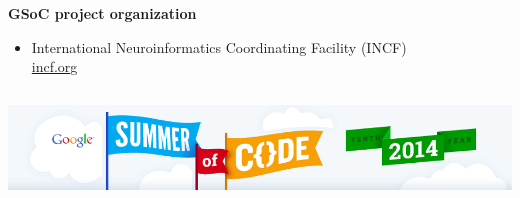 \begin{frame}
\begin{columns}[t]
\begin{column}{0.59\textwidth}
      \vspace{0.3cm}
      
      \textbf{GSoC project organization}
      \begin{itemize}[leftmargin=0.6cm]
        \itemsep6pt
        \item[] International Neuroinformatics Coordinating Facility (INCF) \\%
          \href{http://incf.org/}{%
            incf.org}
       
      \end{itemize}

    \end{column}
  \end{columns}

  \vspace{0.3cm}




  \begin{center}
    \includegraphics[width=\textwidth]{img/gsoc14_banner.png}
  \end{center}

  

\end{frame}


